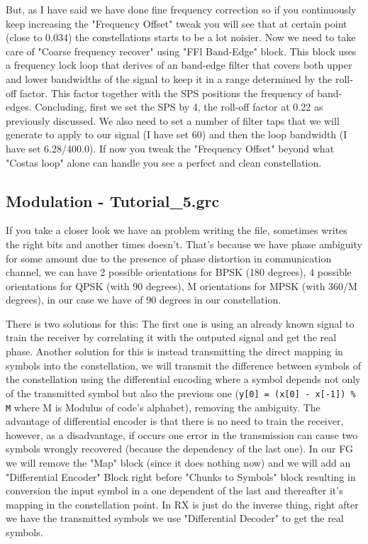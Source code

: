 \documentclass[a4paper, 10pt, conference]{ieeeconf}      %
\begin{document}
    But, as I have said we have done fine frequency correction so if you continuously keep increasing the "Frequency Offset" tweak you will see that at certain point (close to 0.034) the constellations starts to be a lot noisier. Now we need to take care of "Coarse frequency recover" using "FFl Band-Edge" block. This block uses a frequency lock loop that derives of an band-edge filter that covers both upper and lower bandwidths of the signal to keep it in a range determined by the roll-off factor. This factor together with the SPS positions the frequency of band-edges.
    Concluding, first we set the SPS by 4, the roll-off factor at 0.22 as previously discussed. We also need to set a number of filter taps that we will generate to apply to our signal (I have set 60) and then the loop bandwidth (I have set 6.28/400.0). If now you tweak the "Frequency Offset" beyond what "Costas loop" alone can handle you see a perfect and clean constellation. 

\subsection{Modulation - Tutorial\_5.grc}
    If you take a closer look we have an problem writing the file, sometimes writes the right bits and another times doesn't.  That's because we have phase ambiguity for some amount due to the presence of phase distortion in communication channel, we can have 2 possible orientations for BPSK (180 degrees), 4 possible orientations for QPSK (with 90 degrees), M orientations for MPSK (with 360/M degrees), in our case we have of 90 degrees in our constellation. 
    
    There is two solutions for this: The first one is using an already known signal to train the receiver by correlating it with the outputed signal and get the real phase.  Another solution for this is instead transmitting the direct mapping in symbols into the constellation, we will transmit the difference between symbols of the constellation using the differential encoding where a symbol depends not only of the transmitted symbol but also the previous one (\verb|y[0] = (x[0] - x[-1]) % M| where M is Modulus of code's alphabet), removing the ambiguity. The advantage of differential encoder is that there is no need to train the receiver, however, as a disadvantage, if occurs one error in the transmission can cause two symbols wrongly recovered (because the dependency of the last one).
    In our FG we will remove the "Map" block (since it does nothing now) and we will add an "Differential Encoder" Block right before "Chunks to Symbols" block resulting in conversion the input symbol in a one dependent of the last and thereafter it's mapping in the constellation point. 
    In RX is just do the inverse thing, right after we have the transmitted symbols we use "Differential Decoder" to get the real symbols.
    
\end{document}
